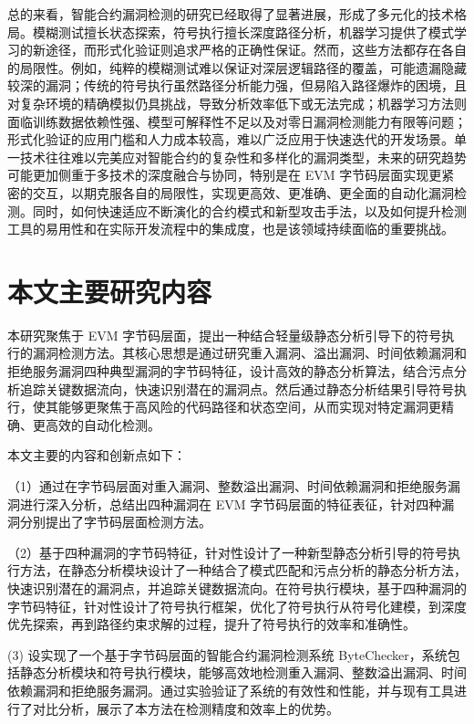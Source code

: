 \documentclass[print, master, vlined, timesmath]{DissertUESTC}
\begin{document}
总的来看，智能合约漏洞检测的研究已经取得了显著进展，形成了多元化的技术格局。模糊测试擅长状态探索，符号执行擅长深度路径分析，机器学习提供了模式学习的新途径，而形式化验证则追求严格的正确性保证。然而，这些方法都存在各自的局限性。例如，纯粹的模糊测试难以保证对深层逻辑路径的覆盖，可能遗漏隐藏较深的漏洞；传统的符号执行虽然路径分析能力强，但易陷入路径爆炸的困境，且对复杂环境的精确模拟仍具挑战，导致分析效率低下或无法完成；机器学习方法则面临训练数据依赖性强、模型可解释性不足以及对零日漏洞检测能力有限等问题；形式化验证的应用门槛和人力成本较高，难以广泛应用于快速迭代的开发场景。单一技术往往难以完美应对智能合约的复杂性和多样化的漏洞类型，未来的研究趋势可能更加侧重于多技术的深度融合与协同，特别是在 EVM 字节码层面实现更紧密的交互，以期克服各自的局限性，实现更高效、更准确、更全面的自动化漏洞检测。同时，如何快速适应不断演化的合约模式和新型攻击手法，以及如何提升检测工具的易用性和在实际开发流程中的集成度，也是该领域持续面临的重要挑战。


\section{本文主要研究内容}

本研究聚焦于 EVM 字节码层面，提出一种结合轻量级静态分析引导下的符号执行的漏洞检测方法。其核心思想是通过研究重入漏洞、溢出漏洞、时间依赖漏洞和拒绝服务漏洞四种典型漏洞的字节码特征，设计高效的静态分析算法，结合污点分析追踪关键数据流向，快速识别潜在的漏洞点。然后通过静态分析结果引导符号执行，使其能够更聚焦于高风险的代码路径和状态空间，从而实现对特定漏洞更精确、更高效的自动化检测。

本文主要的内容和创新点如下：

（1）通过在字节码层面对重入漏洞、整数溢出漏洞、时间依赖漏洞和拒绝服务漏洞进行深入分析，总结出四种漏洞在 EVM 字节码层面的特征表征，针对四种漏洞分别提出了字节码层面检测方法。

（2）基于四种漏洞的字节码特征，针对性设计了一种新型静态分析引导的符号执行方法，在静态分析模块设计了一种结合了模式匹配和污点分析的静态分析方法，快速识别潜在的漏洞点，并追踪关键数据流向。在符号执行模块，基于四种漏洞的字节码特征，针对性设计了符号执行框架，优化了符号执行从符号化建模，到深度优先探索，再到路径约束求解的过程，提升了符号执行的效率和准确性。

(3) 设实现了一个基于字节码层面的智能合约漏洞检测系统 ByteChecker，系统包括静态分析模块和符号执行模块，能够高效地检测重入漏洞、整数溢出漏洞、时间依赖漏洞和拒绝服务漏洞。通过实验验证了系统的有效性和性能，并与现有工具进行了对比分析，展示了本方法在检测精度和效率上的优势。
\end{document}
